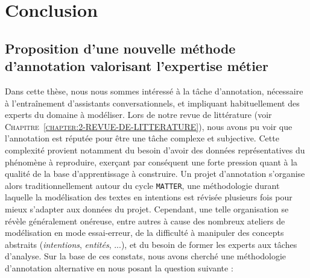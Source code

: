 \chapter{Conclusion}
\label{chapter:6-CONCLUSION}
	
	\section*{Proposition d'une nouvelle méthode d'annotation valorisant l'expertise métier}
	
		Dans cette thèse, nous nous sommes intéressé à la tâche d'annotation, nécessaire à l'entraînement d'assistants conversationnels, et impliquant habituellement des experts du domaine à modéliser.
		Lors de notre revue de littérature (voir \textsc{Chapitre~\ref{chapter:2-REVUE-DE-LITTERATURE}}), nous avons pu voir que l'annotation est réputée pour être une tâche complexe et subjective.
		Cette complexité provient notamment du besoin d'avoir des données représentatives du phénomène à reproduire, exerçant par conséquent une forte pression quant à la qualité de la base d'apprentissage à construire.
		Un projet d'annotation s'organise alors traditionnellement autour du cycle \texttt{MATTER}, une méthodologie durant laquelle la modélisation des textes en intentions est révisée plusieurs fois pour mieux s'adapter aux données du projet.
		Cependant, une telle organisation se révèle généralement onéreuse, entre autres à cause des nombreux ateliers de modélisation en mode essai-erreur, de la difficulté à manipuler des concepts abstraits (\textit{intentions}, \textit{entités}, ...), et du besoin de former les experts aux tâches d'analyse.
		Sur la base de ces constats, nous avons cherché une méthodologie d'annotation alternative en nous posant la question suivante : 
		
